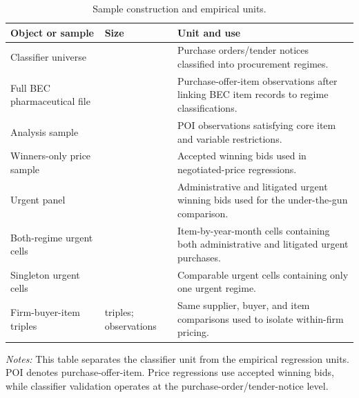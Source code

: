 \begin{table}[ht]
\centering
\caption{Sample construction and empirical units.}
\label{tab:sample_construction_v9}
\begin{threeparttable}
\small
\begin{tabular}{p{.28\linewidth}p{.24\linewidth}p{.38\linewidth}}
\toprule
Object or sample & Size & Unit and use \\
\midrule
Classifier universe & \BPregexNClassified{} & Purchase orders/tender notices classified into procurement regimes. \\
Full BEC pharmaceutical file & \BPnPOIfull{} & Purchase-offer-item observations after linking BEC item records to regime classifications. \\
Analysis sample & \BPnAnalysisSample{} & POI observations satisfying core item and variable restrictions. \\
Winners-only price sample & \BPnegNobs{} & Accepted winning bids used in negotiated-price regressions. \\
Urgent panel & \BPnUTG{} & Administrative and litigated urgent winning bids used for the under-the-gun comparison. \\
Both-regime urgent cells & \BPbothCellN{} & Item-by-year-month cells containing both administrative and litigated urgent purchases. \\
Singleton urgent cells & \BPbothCellNSingleton{} & Comparable urgent cells containing only one urgent regime. \\
Firm-buyer-item triples & \BPutgTripleCountUTG{} triples; \BPutgTripleNUTG{} observations & Same supplier, buyer, and item comparisons used to isolate within-firm pricing. \\
\bottomrule
\end{tabular}
\begin{tablenotes}[flushleft]\footnotesize
\item \textit{Notes:} This table separates the classifier unit from the empirical regression units. POI denotes purchase-offer-item. Price regressions use accepted winning bids, while classifier validation operates at the purchase-order/tender-notice level.
\end{tablenotes}
\end{threeparttable}
\end{table}
